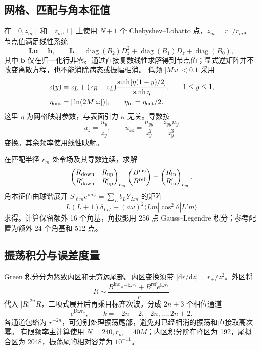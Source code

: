 \documentclass[UTF8,fontset=fandol,11pt,a4paper]{ctexart}
\newcommand{\ii}{\mathrm i}
\newcommand{\dd}{\mathrm d}
\newcommand{\Bin}{B^{\mathrm{inc}}}
\newcommand{\Bref}{B^{\mathrm{ref}}}
\numberwithin{equation}{section}
\begin{document}
\subsection{网格、匹配与角本征值}
在 $[0,z_m]$ 和 $[z_m,1]$ 上使用 $N+1$ 个 Chebyshev--Lobatto 点，$z_m=r_+/r_m$。
节点值满足线性系统
\begin{equation}
\bm L\bm u=\bm b,\qquad
\bm L=\operatorname{diag}(B_2)D_z^2+\operatorname{diag}(B_1)D_z+\operatorname{diag}(B_0),
\end{equation}
其中 $\bm b$ 仅在归一化行非零。通过直接复数线性求解得到节点值；显式逆矩阵并不改变离散方程，也不能消除病态或振幅相消。
低频 $|M\omega|<0.1$ 采用
\begin{align}
z(y)&=z_L+(z_R-z_L)\frac{\sinh[\eta(1-y)/2]}{\sinh\eta},\quad -1\le y\le1,\\
\eta_{\rm out}&=|\ln(2M|\omega|)|,\qquad\eta_{\rm in}=\eta_{\rm out}/2.
\end{align}
这里 $\eta$ 为网格映射参数，与表面引力 $\kappa$ 无关。导数按
\begin{equation}u_z=\frac{u_y}{z_y},\qquad u_{zz}=\frac{u_{yy}}{z_y^2}-\frac{z_{yy}u_y}{z_y^3}\end{equation}
变换。其余频率使用线性映射。

在匹配半径 $r_m$ 处令场及其导数连续，求解
\begin{equation}
\begin{pmatrix}R_{\rm down}&R_{\rm up}\\R'_{\rm down}&R'_{\rm up}\end{pmatrix}_{r_m}
\begin{pmatrix}\Bin\\\Bref\end{pmatrix}
=\begin{pmatrix}R_{\rm in}\\R'_{\rm in}\end{pmatrix}_{r_m}.
\end{equation}
角本征值由球谐展开 $S_{\ell m}e^{\ii m\phi}=\sum_Lb_LY_{Lm}$ 的矩阵
\begin{equation}
L(L+1)\delta_{LL'}-(a\omega)^2\langle Lm|\cos^2\theta|L'm\rangle
\end{equation}
求得。计算保留额外 16 个角基，角投影用 256 点 Gauss--Legendre 积分；参考配置为额外 24 个角基和 512 点。

\subsection{振荡积分与误差度量}
Green 积分分为紧致内区和无穷远尾部。内区变换须带 $|\dd r/\dd z|=r_+/z^2$。外区将
\begin{equation}
R\sim\frac{\Bin e^{-\ii\omega r_*}+\Bref e^{\ii\omega r_*}}r
\end{equation}
代入 $|R|^{2n}R$，二项式展开后再乘目标齐次波，分成 $2n+3$ 个相位通道
\begin{equation}
e^{\ii k\omega r_*},\qquad k=-2n-2,-2n,\ldots,2n+2.
\end{equation}
各通道包络为 $r^{-2n}$，可分别处理振荡尾部，避免对已经相消的振荡和直接取高次幂。
有限频率主计算使用 $N=240,r_m=40M$；内区积分阶在峰区为 192，尾拟合区为 2048，振荡尾的相对容差为 $10^{-11}$。
\end{document}
